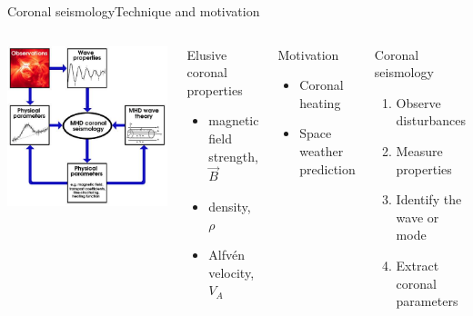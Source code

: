 \documentclass[11pt,table]{beamer}
\begin{document}
\begin{frame}{Coronal seismology}{Technique and motivation}
    \begin{columns}
        \includegraphics[width=\textwidth]{schematic.png}
        \begin{block}{Elusive coronal properties}
            \begin{itemize}
                \item magnetic field strength, $\vec{B}$
                \item density, $\rho$
                \item Alfv\'en velocity, $V_A$
            \end{itemize}
        \end{block}
        \begin{block}{Motivation}
            \begin{itemize}
                \item Coronal heating
                \item Space weather prediction
            \end{itemize}
        \end{block}
        \begin{block}{Coronal seismology}
            \begin{enumerate}
                \item Observe disturbances
                \item Measure properties
                \item Identify the wave or mode
                \item Extract coronal parameters
            \end{enumerate}
        \end{block}
    \end{columns}
\end{frame}%
\end{document}
